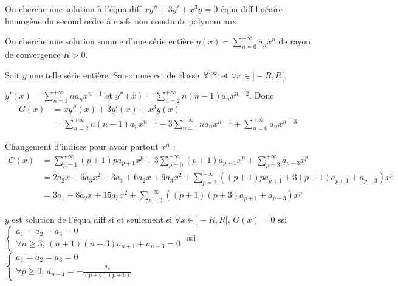 \begin{exemple}
    On cherche une solution à l'équa diff $x y'' + 3 y' + x^3 y = 0$ équa diff linéaire homogène 
    du second ordre à coefs non constants polynomiaux. 

    On cherche une solution somme d'une série entière $\displaystyle y(x) = \sum_{n = 0}^{+\infty} a_n x^n$
    de rayon de convergence $R > 0$.

    Soit $y $ une telle série entière. Sa somme est de classe $\,\mathscr C^{\infty}$ et 
    $\displaystyle \forall x \in ]-R, R[$, 
    
    $\displaystyle y'(x) = \sum_{n = 1}^{+\infty} n a_n x^{n - 1}$ et
    $\displaystyle y''(x) = \sum_{n = 2}^{+\infty} n (n - 1) a_n x^{n - 2}$.
    Donc 
    \begin{align}
        G(x) & = xy''(x) + 3y'(x) + x^3y(x) \\
        & = \sum_{n = 2 }^{+ \infty   } n (n - 1) a_n x^{n - 1} + 3 \sum_{n = 1}^{+\infty} n a_n x^{n - 1} + \sum_{n = 0}^{+\infty} a_n x^{n + 3} 
    \end{align}

    Changement d'indices pour avoir partout $x^n$ :
    \begin{align}
        G(x) & = \sum_{p = 1}^{+\infty} (p + 1) p a_{p + 1} x^p + 3 \sum_{p = 0}^{+\infty} (p + 1) a_{p + 1} x^p + \sum_{p = 3}^{+\infty} a_{p - 3} x^p \\
        & = 2 a_2 x + 6 a_3 x^2 + 3 a_1 + 6 a_2 x + 9 a_3 x^2 + \sum_{p = 3}^{+\infty} \left( (p + 1) p a_{p + 1} + 3 (p + 1) a_{p + 1} + a_{p - 3} \right) x^p \\
        & = 3 a_1 + 8 a_2 x + 15 a_3 x^2 + \sum_{p = 3}^{+\infty} \left( (p + 1)(p + 3) a_{p + 1} + a_{p - 3} \right) x^p
    \end{align}

    $y$ est solution de l'équa diff si et seulement si $\forall x \in ]-R, R[, \, G(x) = 0$ 
    ssi $\left\{ \begin{matrix}
        a_1 = a_2 = a_3 = 0 \\
        \forall n \geqslant 3, \, (n + 1) (n + 3) a_{n + 1} + a_{n - 3} = 0
    \end{matrix}\right.$ ssi $\left\{ 
       \begin{matrix}
        a_1 = a_2 = a_3 = 0 \\
        \forall p \geqslant 0, \, a_{p + 4} = - \frac{a_p}{(p + 4)(p + 6)}
       \end{matrix} 
    \right.$


\end{exemple}
